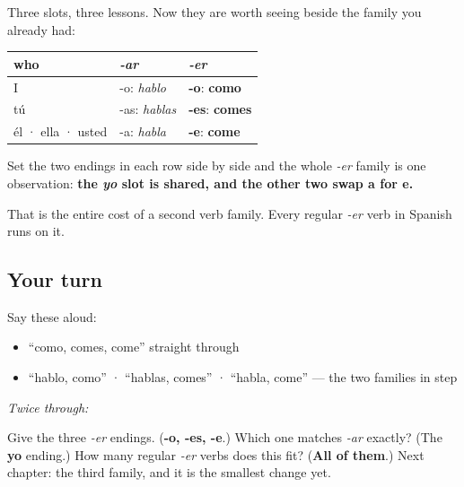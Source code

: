 \begin{grammarlens}[title={Grammar Lens: the table you have earned}]
Three slots, three lessons. Now they are worth seeing beside the family you already had:

\noindent
\begin{tabularx}{\linewidth}{@{}>{\raggedright\arraybackslash}X>{\raggedright\arraybackslash}X>{\raggedright\arraybackslash}X@{}}
\toprule
\textbf{who} & \textbf{\emph{-ar}} & \textbf{\emph{-er}} \\
\midrule
I & -o: \emph{hablo} & \textbf{-o}: \textbf{como} \\
tú & -as: \emph{hablas} & \textbf{-es}: \textbf{comes} \\
él · ella · usted & -a: \emph{habla} & \textbf{-e}: \textbf{come} \\
\bottomrule
\end{tabularx}

Set the two endings in each row side by side and the whole \emph{-er} family is one observation: \textbf{the \emph{yo} slot is shared, and the other two swap a for e.}

That is the entire cost of a second verb family. Every regular \emph{-er} verb in Spanish runs on it.
\end{grammarlens}

\subsection*{Your turn}
Say these aloud:

\begin{itemize}
\raggedright
  \item \textquotedblleft{}como, comes, come\textquotedblright{} straight through
  \item \textquotedblleft{}hablo, como\textquotedblright{} · \textquotedblleft{}hablas, comes\textquotedblright{} · \textquotedblleft{}habla, come\textquotedblright{} — the two families in step
\end{itemize}

\emph{Twice through:}

\begin{tcolorbox}[breakable,colback=teal!4,colframe=teal!35!black,title={Before you move on}]
Give the three \emph{-er} endings. (\textbf{-o, -es, -e}.) Which one matches \emph{-ar} exactly? (The \textbf{yo} ending.) How many regular \emph{-er} verbs does this fit? (\textbf{All of them}.) Next chapter: the third family, and it is the smallest change yet.
\end{tcolorbox}
